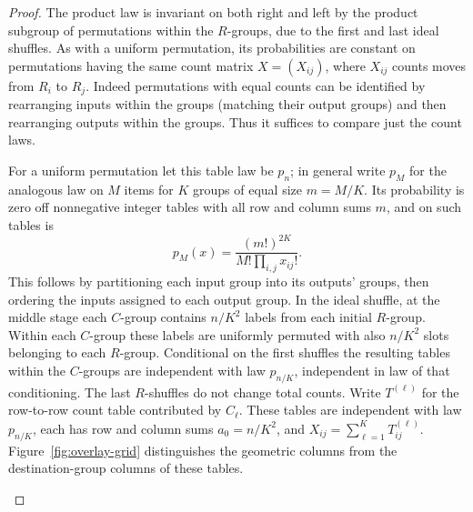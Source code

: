\begin{proof}
The product law is invariant on both right and left by the product subgroup of permutations within the \(R\)-groups, due to the first and last ideal shuffles. As with a uniform permutation, its probabilities are constant on permutations having the same count matrix \(X=(X_{ij})\), where \(X_{ij}\) counts moves from \(R_i\) to \(R_j\). Indeed permutations with equal counts can be identified by rearranging inputs within the groups (matching their output groups) and then rearranging outputs within the groups. Thus it suffices to compare just the count laws.

For a uniform permutation let this table law be \(p_n\); in general write \(p_M\) for the analogous law on \(M\) items for \(K\) groups of equal size \(m=M/K\). Its probability is zero off nonnegative integer tables with all row and column sums \(m\), and on such tables is
\begin{equation}
 p_M(x)=\frac{(m!)^{2K}}{M!\prod_{i,j}x_{ij}!}.                        \label{special:overlay:eq:6}
\end{equation}
This follows by partitioning each input group into its outputs' groups, then ordering the inputs assigned to each output group. In the ideal shuffle, at the middle stage each \(C\)-group contains \(n/K^2\) labels from each initial \(R\)-group. Within each \(C\)-group these labels are uniformly permuted with also \(n/K^2\) slots belonging to each \(R\)-group. Conditional on the first shuffles the resulting tables within the \(C\)-groups are independent with law \(p_{n/K}\), independent in law of that conditioning. The last \(R\)-shuffles do not change total counts. Write \(T^{(\ell)}\) for the row-to-row count table contributed by \(C_\ell\). These tables are independent with law \(p_{n/K}\), each has row and column sums \(a_0=n/K^2\), and \(X_{ij}=\sum_{\ell=1}^K T^{(\ell)}_{ij}\). Figure~\ref{fig:overlay-grid} distinguishes the geometric columns from the destination-group columns of these tables.

\begin{figure}[htbp]
\centering
{}
\end{figure}
\end{proof}
